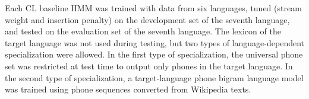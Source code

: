 Each {\color{blue} {\sc CL} baseline}
HMM was trained with data from six languages, tuned
(stream weight and insertion penalty)
on the development set of the seventh language, and
tested on the evaluation set of the seventh language.  The lexicon of
the target language was not used during testing, but two types of
language-dependent specialization were allowed.  In the first type of
specialization, the universal phone set was restricted at test time to
output only phones in the target language.  In the second type of
specialization, a target-language phone bigram language model was
trained using phone sequences converted from Wikipedia texts.



